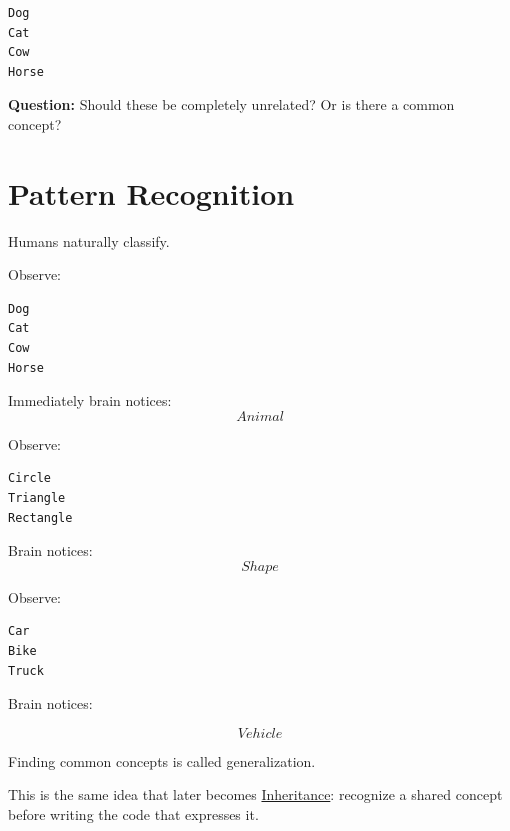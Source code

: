 \documentclass[11pt,a4paper]{book}
\begin{document}
\begin{verbatim}
Dog
Cat
Cow
Horse
\end{verbatim}

\textbf{Question:} Should these be completely unrelated?
          Or is there a common concept?


\section{Pattern Recognition}

Humans naturally classify.


Observe:

\begin{verbatim}
Dog
Cat
Cow
Horse
\end{verbatim}

Immediately brain notices: \[Animal\]


Observe:

\begin{verbatim}
Circle
Triangle
Rectangle
\end{verbatim}

Brain notices: \[Shape\]


Observe:

\begin{verbatim}
Car
Bike
Truck
\end{verbatim}

Brain notices:

\[
Vehicle
\]


\begin{idea}

Finding common concepts is called
generalization.

This is the same idea that later becomes \hyperref[chap:inheritance]{Inheritance}: recognize a shared concept before writing the code that expresses it.

\end{idea}

\end{document}
